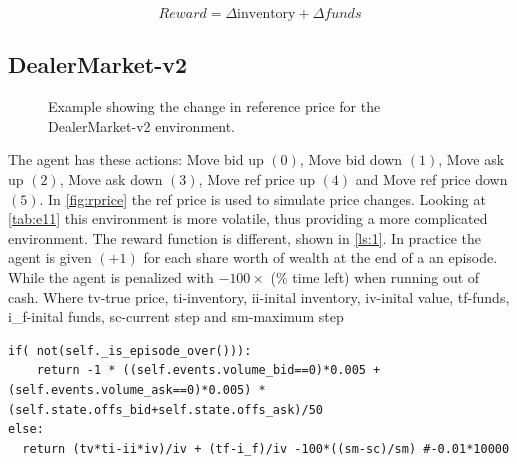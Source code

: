 \documentclass{kththesis}
\theoremstyle{definition}
\begin{document}
\begin{equation}
    \label{eq:m7}
    Reward = \Delta \text{inventory} + \Delta funds
\end{equation}


\subsection{DealerMarket-v2}
\begin{figure}[H]
	    	\centering
		
		\caption{Example showing the change in reference price for the DealerMarket-v2 environment. }
		\label{fig:rprice}
\end{figure}
The agent has these actions: Move bid up $(0)$, Move bid down $(1)$, Move ask up $(2)$,  Move ask down $(3)$,  Move ref price up $(4)$ and Move ref price down $(5)$. In \autoref{fig:rprice} the ref price is used to simulate price changes. Looking at \autoref{tab:e11} this environment is more volatile, thus providing a more complicated environment. The reward function is different, shown in \autoref{ls:1}. In practice the agent is given $(+1)$ for each share worth of wealth at the end of a an episode. While the agent is penalized with $- 100 \times$ (\% time left) when running out of cash. Where tv-true price, ti-inventory, ii-inital inventory, iv-inital value, tf-funds, i\_f-inital funds, sc-current step and sm-maximum step
\begin{lstlisting}[caption={Reward function for DealerMarket-v2.},captionpos=b, label=ls:1]
if( not(self._is_episode_over())):   
    return -1 * ((self.events.volume_bid==0)*0.005 + (self.events.volume_ask==0)*0.005) * (self.state.offs_bid+self.state.offs_ask)/50
else: 
  return (tv*ti-ii*iv)/iv + (tf-i_f)/iv -100*((sm-sc)/sm) #-0.01*10000

\end{lstlisting}
\end{document}
